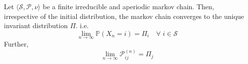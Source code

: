 \begin{theorem}
    Let \(\langle \mathcal{S} , \mathcal{P} , \nu \rangle\) be a finite irreducible and aperiodic markov chain. Then,
    irrespective of the initial distribution, the markov chain converges to the unique invariant distribution \(\Pi\). i.e.
    \[
        \lim_{n \to \infty} \mathbb{P} (X_n = i) = \Pi _i \quad \forall \; i \in \mathcal{S}  
    \]
    Further,
    \[
        \lim_{n \to \infty} \mathcal{P}_{ij}^{(n)} = \Pi _j
    \] 
\end{theorem}